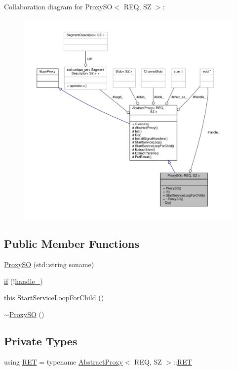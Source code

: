 Collaboration diagram for Proxy\+SO$<$ R\+EQ, SZ $>$\+:
\nopagebreak
\begin{figure}[H]
\begin{center}
\leavevmode
\includegraphics[width=350pt]{classProxySO__coll__graph}
\end{center}
\end{figure}
\subsection*{Public Member Functions}
\begin{DoxyCompactItemize}
\item 
\hyperlink{classProxySO_a75fcf01c02b0aae33be41eea99a8b3e3}{Proxy\+SO} (std\+::string soname)
\item 
\hyperlink{classProxySO_affdd32b972bf9459a0f7ba37ec44a66a}{if} (!\hyperlink{classProxySO_a8db0f87ceb9dc54bd30b212394a74d09}{handle\+\_\+})
\item 
this \hyperlink{classProxySO_a1b036308a00c892930eb4e4955ed4716}{Start\+Service\+Loop\+For\+Child} ()
\item 
\hyperlink{classProxySO_acfe42e6a280ffe394926d16ddd13c3d2}{$\sim$\+Proxy\+SO} ()
\end{DoxyCompactItemize}
\subsection*{Private Types}
\begin{DoxyCompactItemize}
\item 
using \hyperlink{classProxySO_aab633f27d11bc301d3fe6714293cdff9}{R\+ET} = typename \hyperlink{classAbstractProxy}{Abstract\+Proxy}$<$ R\+EQ, SZ $>$\+::\hyperlink{classAbstractProxy_ab2af611a27c14916a27d0e9249f0291b}{R\+ET}
\end{DoxyCompactItemize}
